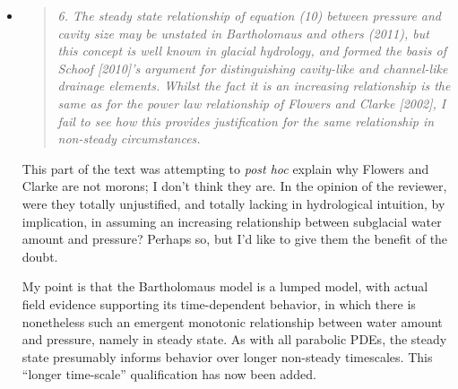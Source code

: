 \documentclass[11pt,reqno]{amsart}
\newcommand{\reply}[2]{
\medskip\medskip
\item  \begin{quote}
\emph{#1}
\end{quote}

\medskip
\noindent #2}
\begin{document}
\begin{itemize}
\reply{6. The steady state relationship of equation (10) between pressure and cavity size may be unstated in Bartholomaus and others (2011), but this concept is well known in glacial hydrology, and formed the basis of Schoof [2010]’s argument for distinguishing cavity-like and channel-like drainage elements. Whilst the fact it is an increasing relationship is the same as for the power law relationship of Flowers and Clarke [2002], I fail to see how this provides justification for the same relationship in non-steady circumstances.}
{This part of the text was attempting to \emph{post hoc} explain why Flowers and Clarke are not morons; I don't think they are.  In the opinion of the reviewer, were they totally unjustified, and totally lacking in hydrological intuition, by implication, in assuming an increasing relationship between subglacial water amount and pressure?  Perhaps so, but I'd like to give them the benefit of the doubt.

My point is that the Bartholomaus model is a lumped model, with actual field evidence supporting its time-dependent behavior, in which there is nonetheless such an emergent monotonic relationship between water amount and pressure, namely in steady state.  As with all parabolic PDEs, the steady state presumably informs behavior over longer non-steady timescales.  This ``longer time-scale'' qualification has now been added.}
\end{itemize}
\end{document}
